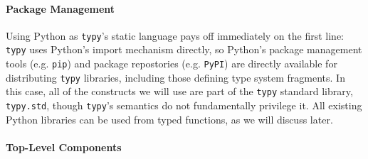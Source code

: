 \documentclass[preprint,10pt]{sigplanconf}
\newcommand{\lip}[1]{\lstinline[language=Python,basicstyle=\ttfamily\small,deletendkeywords={tuple,buffer,map}]{#1}}
\begin{document}
\paragraph{Package Management} Using Python as \verb|typy|'s static language pays off immediately on the first line: \texttt{typy} uses Python's import mechanism directly, so Python's package management tools (e.g. \lip{pip}) and package repostories (e.g. \lip{PyPI}) are directly available for distributing \texttt{typy} libraries, including those defining type system fragments. In this case, all of the constructs we will use are part of the \verb|typy| standard library, \texttt{typy.std}, though \texttt{typy}'s semantics do not fundamentally privilege it. All existing Python libraries can be used from typed functions, as we will discuss later.%



\paragraph{Top-Level Components}
\end{document}
